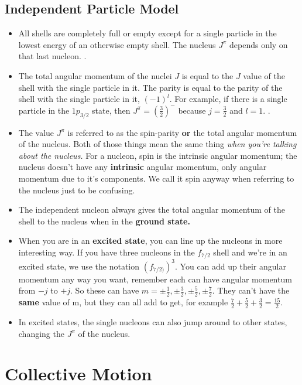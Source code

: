 \documentclass[letter]{article}
\begin{document}
\subsection{Independent Particle Model}
\begin{itemize}
\item All shells are completely full or empty except for a single
  particle in the lowest energy of an otherwise empty shell. The
  nucleus $J^\pi$ depends only on that last
  nucleon. \cite[Lec. 13-16]{lecture}.
\item The total angular momentum of the nuclei $J$ is equal to the
  $J$ value of the shell with the single particle in it. The parity
  is equal to the parity of the shell with the single particle in it,
  $(-1)^l$. For example, if there is a single particle in the
  $1p_{3/2}$ state, then $J^\pi=(\frac{3}{2})^{-}$ because
  $j=\frac{3}{2}$ and $l=1$. \cite[Lec. 13-16]{lecture}.
\item The value $J^\pi$ is referred to as the spin-parity \textbf{or}
  the total angular momentum of the nucleus. Both of those
  things mean the same thing \textit{when you're talking about the
    nucleus.} For a nucleon, spin is the intrinsic angular momentum;
  the nucleus doesn't have any \textbf{intrinsic} angular momentum,
  only angular momentum due to it's components. We call it spin anyway
  when referring to the nucleus just to be confusing.
\item The independent nucleon always gives the total angular momentum
  of the shell to the nucleus when in the \textbf{ground state.}
\item When you are in an \textbf{excited state}, you can line up the
  nucleons in more interesting way. If you have three nucleons in the
  $f_{7/2}$ shell and we're in an excited state, we use the notation
  $(f_{7/2)})^3$. You can add up their angular momentum any way you
  want, remember each can have angular momentum from $-j$ to $+j$. So
  these can have $m=\pm\frac{1}{2}, \pm\frac{3}{2}, \pm\frac{5}{2},
  \pm\frac{7}{2}$. They can't have the \textbf{same} value of m, but
  they can all add to get, for example
  $\frac{7}{2}+\frac{5}{2}+\frac{3}{2}=\frac{15}{2}$.~\cite[pp. 149-151]{krane}
\item In excited states, the single nucleons can also jump around to
  other states, changing the $J^\pi$ of the nucleus.~\cite[Lec. 13-16]{lecture}
\end{itemize}

\section{Collective Motion}
\end{document}
